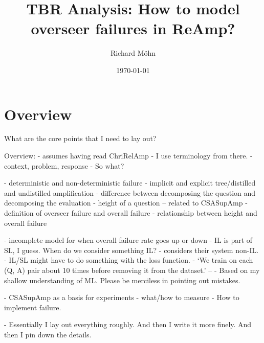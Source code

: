 \documentclass{farlamp}
\title{TBR Analysis: How to model overseer failures in ReAmp?}
\author{Richard Möhn}
\date{\today}
\begin{document}
\maketitle
\tableofcontents

\section{Overview}

What are the core points that I need to lay out?

Overview:
- assumes having read ChriRelAmp
    - I use terminology from there.
- context, problem, response
- So what?

- deterministic and non-deterministic failure
- implicit and explicit tree/distilled and undistilled amplification
- difference between decomposing the question and decomposing the evaluation
- height of a question – related to CSASupAmp
- definition of overseer failure and overall failure
- relationship between height and overall failure

- incomplete model for when overall failure rate goes up or down
    - IL is part of SL, I guess. When do we consider something IL?
    - \cite[sec. 1.1]{CSASupAmp} considers their system non-IL.
    - IL/SL might have to do something with the loss function.
    - ‘We train on each (Q, A) pair about 10 times before removing it from the
    dataset.’ – \cite[footnote 3]{CSASupAmp}
- Based on my shallow understanding of ML. Please be merciless in pointing out
mistakes.

- CSASupAmp as a basis for experiments
    - what/how to measure
- How to implement failure.


- Essentially I lay out everything roughly. And then I write it more finely. And
then I pin down the details.
\end{document}
